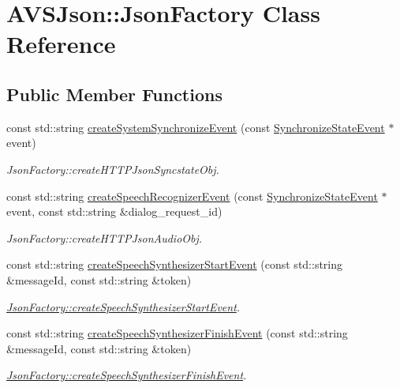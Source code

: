 \hypertarget{classAVSJson_1_1JsonFactory}{}\section{A\+V\+S\+Json\+:\+:Json\+Factory Class Reference}
\label{classAVSJson_1_1JsonFactory}
\subsection*{Public Member Functions}
\begin{DoxyCompactItemize}
\item 
const std\+::string \hyperlink{classAVSJson_1_1JsonFactory_a81f6e5126ee5a0fe06adfb7a2de3bde6}{create\+System\+Synchronize\+Event} (const \hyperlink{structAVSJson_1_1SynchronizeStateEvent}{Synchronize\+State\+Event} $\ast$event)
\begin{DoxyCompactList}\small\item\em Json\+Factory\+::create\+H\+T\+T\+P\+Json\+Syncstate\+Obj. \end{DoxyCompactList}\item 
const std\+::string \hyperlink{classAVSJson_1_1JsonFactory_ac87cea12e6e85b725c62a35a89816458}{create\+Speech\+Recognizer\+Event} (const \hyperlink{structAVSJson_1_1SynchronizeStateEvent}{Synchronize\+State\+Event} $\ast$event, const std\+::string \&dialog\+\_\+request\+\_\+id)
\begin{DoxyCompactList}\small\item\em Json\+Factory\+::create\+H\+T\+T\+P\+Json\+Audio\+Obj. \end{DoxyCompactList}\item 
const std\+::string \hyperlink{classAVSJson_1_1JsonFactory_a74054bd58dc43cf48d10e4e2b7dd36b8}{create\+Speech\+Synthesizer\+Start\+Event} (const std\+::string \&message\+Id, const std\+::string \&token)
\begin{DoxyCompactList}\small\item\em \hyperlink{classAVSJson_1_1JsonFactory_a74054bd58dc43cf48d10e4e2b7dd36b8}{Json\+Factory\+::create\+Speech\+Synthesizer\+Start\+Event}. \end{DoxyCompactList}\item 
const std\+::string \hyperlink{classAVSJson_1_1JsonFactory_a7eaa5203dd954ce2f2d60e3a7f3b0fb5}{create\+Speech\+Synthesizer\+Finish\+Event} (const std\+::string \&message\+Id, const std\+::string \&token)
\begin{DoxyCompactList}\small\item\em \hyperlink{classAVSJson_1_1JsonFactory_a7eaa5203dd954ce2f2d60e3a7f3b0fb5}{Json\+Factory\+::create\+Speech\+Synthesizer\+Finish\+Event}. \end{DoxyCompactList}\item 

\end{DoxyCompactItemize}
